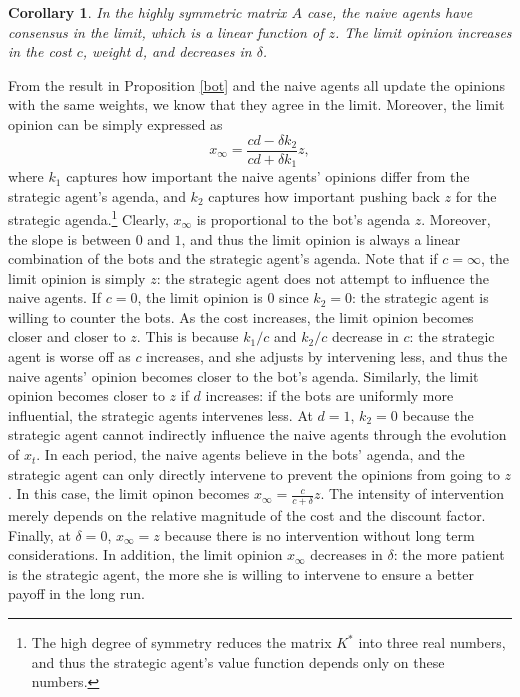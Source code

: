 \documentclass{article}
\newtheorem{corollary}{Corollary}
\begin{document}
\begin{corollary}
In the highly symmetric matrix $A$ case, the naive agents have consensus in the limit, which is a linear function of $z$. The limit opinion increases in the cost $c$, weight $d$, and decreases in $\delta$.
\end{corollary}
From the result in Proposition \ref{bot} and the naive agents all update the opinions with the same weights, we know that they agree in the limit. Moreover, the limit opinion can be simply expressed as  $$x_\infty=\frac{cd-\delta k_2}{cd+\delta k_1}z,$$ where $k_1$ captures how important the naive agents' opinions differ from the strategic agent's agenda, and $k_2$ captures how important pushing back $z$ for the strategic agenda.\footnote{The high degree of symmetry reduces the matrix $K^*$ into three real numbers, and thus the strategic agent's value function depends only on these numbers.} Clearly, $x_\infty$ is proportional to the bot's agenda $z$. Moreover, the slope is between $0$ and $1$, and thus the limit opinion is always a linear combination of the bots and the strategic agent's agenda.  Note that if $c=\infty$, the limit opinion is simply $z$: the strategic agent does not attempt to influence the naive agents. If $c=0$, the limit opinion is $0$ since $k_2=0$: the strategic agent is willing to counter the bots. As the cost increases, the limit opinion becomes closer and closer to $z$. This is because $k_1/c$ and $k_2/c$ decrease in $c$: the strategic agent is worse off as $c$ increases, and she adjusts by intervening less, and thus the naive agents' opinion becomes closer to the bot's agenda. Similarly, the limit opinion becomes closer to $z$ if $d$ increases: if the bots are uniformly more influential, the strategic agents intervenes less. At $d=1$, $k_2=0$ because the strategic agent cannot indirectly influence the naive agents through the evolution of $x_t$. In each period, the naive agents believe in the bots' agenda, and the strategic agent can only directly intervene to prevent the opinions from going to $z$. In this case, the limit opinon becomes $x_\infty=\frac{c}{c+\delta}z$. The intensity of intervention merely depends on the relative magnitude of the cost and the discount factor. Finally, at $\delta=0$, $x_\infty=z$ because there is no intervention without long term considerations. In addition, the limit opinion $x_\infty$ decreases in $\delta$: the more patient is the strategic agent, the more she is willing to intervene to ensure a better payoff in the long run.
\end{document}
